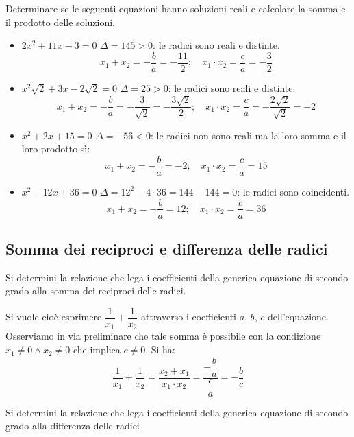 \begin{esempio}
Determinare se le seguenti equazioni hanno soluzioni reali e calcolare la 
somma e il prodotto delle soluzioni.
 \begin{itemize}
 \item \(2 x^2 +11 x -3 = 0\) \qquad 
\(\Delta = 145 > 0\): le radici sono reali e distinte.
\[x_1 +x_2 = -\dfrac{b}{a} = -\dfrac{11}{2};\quad 
x_1 \cdot x_2 = \dfrac{c}{a} = -\dfrac{3}{2}\]

 \item \(x^2 \sqrt{2} +3 x -2 \sqrt{2} = 0\) \qquad 
\(\Delta = 25 > 0\): le radici sono reali e distinte.
\[x_1 +x_2 = -\dfrac{b}{a} = -\dfrac{3}{\sqrt{2}} = -\dfrac{3 \sqrt{2}}{2};
\quad 
x_1 \cdot x_2 = \dfrac{c}{a} = -\dfrac{2 \sqrt{2}}{\sqrt{2}} = -2\]

 \item \(x^2 +2 x +15 = 0\) \qquad 
\(\Delta = -56 < 0\): le radici non sono reali ma la loro somma e il loro 
prodotto sì: 
\[x_1 +x_2 = -\dfrac{b}{a} = -2; \quad x_1 \cdot x_2 = \dfrac{c}{a} = 15\]

 \item \(x^2 -12 x +36 = 0\) \qquad 
\(\Delta = 12^{2} -4 \cdot 36 = 144 -144 = 0\): le radici sono coincidenti.
\[x_1 +x_2 = -\dfrac{b}{a} = 12; \quad x_1 \cdot x_2 = \dfrac{c}{a} = 36\]
 \end{itemize}
\end{esempio}

\subsection{Somma dei reciproci e differenza delle radici}

Si determini la relazione che lega i coefficienti della generica equazione di 
secondo grado alla somma dei reciproci delle radici.

Si vuole cioè esprimere \(\dfrac{1}{x_1} +\dfrac{1}{x_2}\) attraverso i 
coefficienti \(a\), \(b\), \(c\) dell'equazione. Osserviamo in via 
preliminare che tale somma è possibile con la condizione 
\(x_1 \neq 0 \wedge x_2 \neq 0\) 
che implica \(c \neq 0\). Si ha: 
\[\dfrac{1}{x_1} +\dfrac{1}{x_2} = \dfrac{x_2 +x_1}{x
_{1} \cdot x_2} = \dfrac{-\dfrac{b}{a}}{\dfrac{c}{a}} = -\dfrac{b}{c}\]

Si determini la relazione che lega i coefficienti della generica equazione di 
secondo grado alla differenza delle radici

